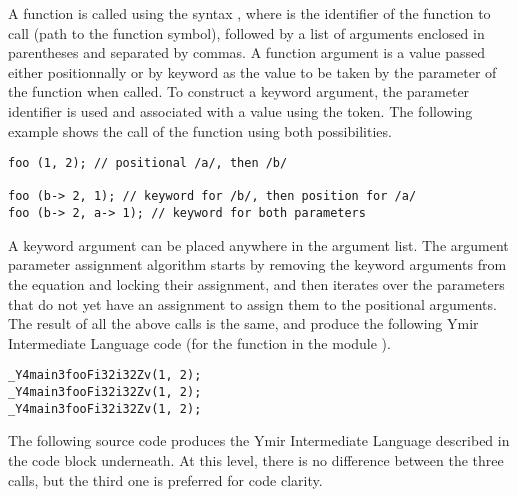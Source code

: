 A function is called using the syntax , where
 is the identifier of the function to call (path to the function
symbol), followed by a list of arguments enclosed in parentheses and separated
by commas. A function argument is a value passed either positionnally or by
keyword as the value to be taken by the parameter of the function when called.
To construct a keyword argument, the parameter identifier is used and associated
with a value using the \token{->} token. The following example shows the call
of the function  using both possibilities.

\begin{lstlisting}[style=coloredverbatim]
foo (1, 2); // positional /a/, then /b/

foo (b-> 2, 1); // keyword for /b/, then position for /a/
foo (b-> 2, a-> 1); // keyword for both parameters
\end{lstlisting}

A keyword argument can be placed anywhere in the argument list. The argument
parameter assignment algorithm starts by removing the keyword arguments from the
equation and locking their assignment, and then iterates over the parameters
that do not yet have an assignment to assign them to the positional arguments.
The result of all the above calls is the same, and produce the following Ymir
Intermediate Language code (for the function  in the module
).

\begin{lstlisting}[style=intermediateVerb]
_Y4main3fooFi32i32Zv(1, 2);
_Y4main3fooFi32i32Zv(1, 2);
_Y4main3fooFi32i32Zv(1, 2);
\end{lstlisting}


The following source code produces the Ymir Intermediate Language described in
the code block underneath. At this level, there is no difference between the
three calls, but the third one is preferred for code clarity.

